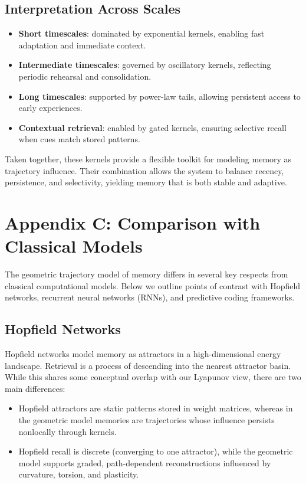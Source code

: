 \documentclass[a4paper,12pt]{article}
\begin{document}
\subsection*{Interpretation Across Scales}
\begin{itemize}
    \item \textbf{Short timescales}: dominated by exponential kernels, enabling 
    fast adaptation and immediate context.
    \item \textbf{Intermediate timescales}: governed by oscillatory kernels, 
    reflecting periodic rehearsal and consolidation.
    \item \textbf{Long timescales}: supported by power-law tails, allowing 
    persistent access to early experiences.
    \item \textbf{Contextual retrieval}: enabled by gated kernels, ensuring 
    selective recall when cues match stored patterns.
\end{itemize}

Taken together, these kernels provide a flexible toolkit for modeling memory as 
trajectory influence. Their combination allows the system to balance recency, 
persistence, and selectivity, yielding memory that is both stable and adaptive.


\section*{Appendix C: Comparison with Classical Models}

The geometric trajectory model of memory differs in several key respects from 
classical computational models. Below we outline points of contrast with 
Hopfield networks, recurrent neural networks (RNNs), and predictive coding 
frameworks.

\subsection*{Hopfield Networks}
Hopfield networks model memory as attractors in a high-dimensional energy 
landscape. Retrieval is a process of descending into the nearest attractor 
basin. While this shares some conceptual overlap with our Lyapunov view, 
there are two main differences:
\begin{itemize}
    \item Hopfield attractors are static patterns stored in weight matrices, 
    whereas in the geometric model memories are trajectories whose influence 
    persists nonlocally through kernels.
    \item Hopfield recall is discrete (converging to one attractor), while the 
    geometric model supports graded, path-dependent reconstructions influenced 
    by curvature, torsion, and plasticity.
\end{itemize}
\end{document}
